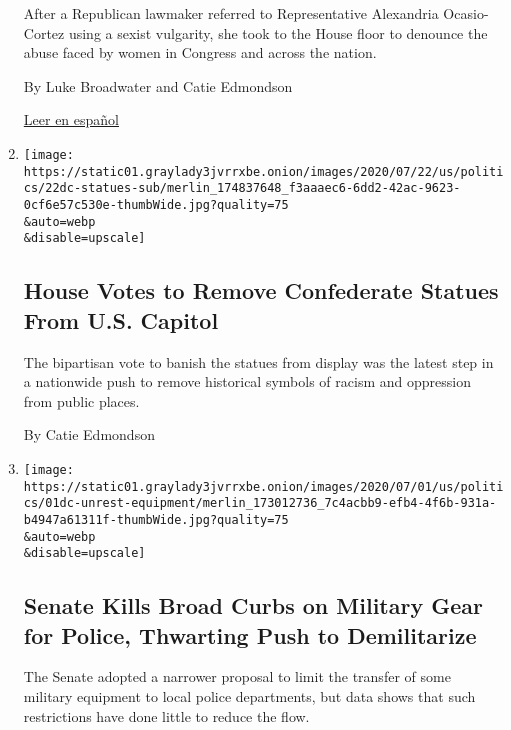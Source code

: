 \begin{enumerate}
  After a Republican lawmaker referred to Representative Alexandria
  Ocasio-Cortez using a sexist vulgarity, she took to the House floor to
  denounce the abuse faced by women in Congress and across the nation.

  By Luke Broadwater and Catie Edmondson

  \href{https://www.nytimes3xbfgragh.onion/es/2020/07/24/espanol/estados-unidos/alexandria-ocasio-cortez-insulto.html}{Leer
  en español}
\item
  \href{/2020/07/22/us/politics/confederate-statues-us-capitol.html}{}

  \texttt{[image: https://static01.graylady3jvrrxbe.onion/images/2020/07/22/us/politics/22dc-statues-sub/merlin\_174837648\_f3aaaec6-6dd2-42ac-9623-0cf6e57c530e-thumbWide.jpg?quality=75\\\&auto=webp\\\&disable=upscale]}

  \hypertarget{house-votes-to-remove-confederate-statues-from-us-capitol}{%
  \subsection{House Votes to Remove Confederate Statues From U.S.
  Capitol}\label{house-votes-to-remove-confederate-statues-from-us-capitol}}

  The bipartisan vote to banish the statues from display was the latest
  step in a nationwide push to remove historical symbols of racism and
  oppression from public places.

  By Catie Edmondson
\item
  \href{/2020/07/21/us/politics/senate-police-military-equipment.html}{}

  \texttt{[image: https://static01.graylady3jvrrxbe.onion/images/2020/07/01/us/politics/01dc-unrest-equipment/merlin\_173012736\_7c4acbb9-efb4-4f6b-931a-b4947a61311f-thumbWide.jpg?quality=75\\\&auto=webp\\\&disable=upscale]}

  \hypertarget{senate-kills-broad-curbs-on-military-gear-for-police-thwarting-push-to-demilitarize}{%
  \subsection{Senate Kills Broad Curbs on Military Gear for Police,
  Thwarting Push to
  Demilitarize}\label{senate-kills-broad-curbs-on-military-gear-for-police-thwarting-push-to-demilitarize}}

  The Senate adopted a narrower proposal to limit the transfer of some
  military equipment to local police departments, but data shows that
  such restrictions have done little to reduce the flow.


\end{enumerate}
